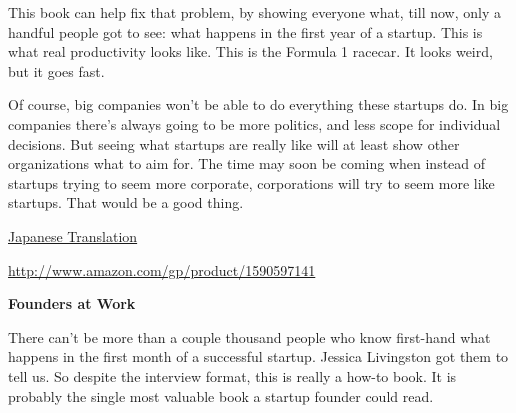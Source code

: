 This book can help fix that problem, by
                  showing everyone what, till now, only a handful people got to
                  see: what happens in the first year of a startup. This is what
                  real productivity looks like. This is the Formula 1 racecar.
                  It looks weird, but it goes fast.

Of course, big
                  companies won't be able to do everything these startups do. In
                  big companies there's always going to be more politics, and
                  less scope for individual decisions. But seeing what startups
                  are really like will at least show other organizations what to
                  aim for. The time may soon be coming when instead of startups
                  trying to seem more corporate, corporations will try to seem
                  more like startups. That would be a good thing.




                  \href{http://www.aoky.net/articles/paul\_graham/foundersatwork.htm}{Japanese Translation}
                  


                  
                  


              
            
          

            
              
            
            
              
                
                  \href{http://www.amazon.com/gp/product/1590597141}{http://www.amazon.com/gp/product/1590597141}
                
              
              
              
                \textbf{Founders at Work}

There can't be more than a
                  couple thousand people who know first-hand what happens in the
                  first month of a successful startup. Jessica Livingston got
                  them to tell us. So despite the interview format, this is
                  really a how-to book. It is probably the single most valuable
                  book a startup founder could read.


              
            
            
              
            
          
